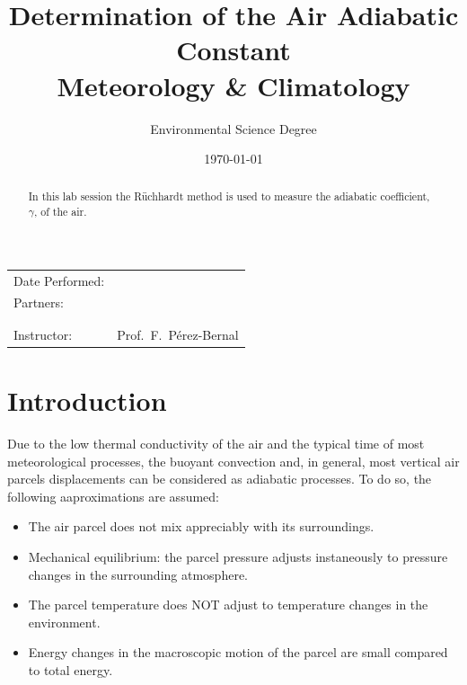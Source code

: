 \documentclass{article}
\title{\textbf{Determination of the Air Adiabatic Constant} \\ Meteorology
  \& Climatology} %
\author{Environmental Science Degree} %
\date{\today} %
\begin{document}
\maketitle %

\begin{center}
\begin{tabular}{l r}
Date Performed: & \underline{\hspace{3cm}}  \\ %
Partners: & \underline{\hspace{6cm}} \\ %
& \underline{\hspace{6cm}} \\
& \underline{\hspace{6cm}} \\
Instructor: & Prof.~F.~Pérez-Bernal %
\end{tabular}
\end{center}

\begin{abstract}
In this lab session the R\"uchhardt method is used to measure the
adiabatic coefficient, $\gamma$, of the air.
\end{abstract}

\section{Introduction}
Due to the low thermal conductivity of the air and the typical time of
most meteorological processes, the buoyant convection and, in general,
most vertical air parcels displacements can be considered as adiabatic
processes. To do so, the following aaproximations are assumed:
\begin{itemize}
\item  The air parcel does not mix appreciably with its surroundings.
\item  Mechanical equilibrium: the parcel pressure adjusts instaneously to pressure changes in the surrounding atmosphere.
\item The parcel temperature does NOT adjust to temperature changes in
  the environment.
\item Energy changes in the macroscopic motion of the parcel are small compared to total energy.
\end{itemize}
\end{document}
